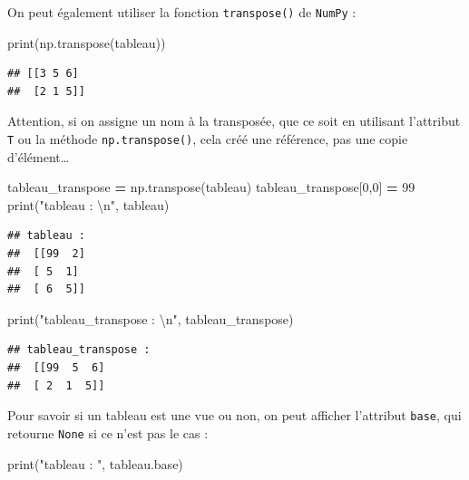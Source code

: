 \documentclass[12pt,]{book}
\newenvironment{Shaded}{\begin{snugshade}}{\end{snugshade}}
\newcommand{\DecValTok}[1]{\textcolor[rgb]{0.00,0.00,0.81}{#1}}
\newcommand{\CharTok}[1]{\textcolor[rgb]{0.31,0.60,0.02}{#1}}
\newcommand{\StringTok}[1]{\textcolor[rgb]{0.31,0.60,0.02}{#1}}
\newcommand{\OperatorTok}[1]{\textcolor[rgb]{0.81,0.36,0.00}{\textbf{#1}}}
\newcommand{\BuiltInTok}[1]{#1}
\newcommand{\NormalTok}[1]{#1}
\numberwithin{equation}{section}
\numberwithin{countremarque}{section}
\begin{document}
On peut également utiliser la fonction \texttt{transpose()} de
\texttt{NumPy} :

\begin{Shaded}
\begin{Highlighting}[]
\BuiltInTok{print}\NormalTok{(np.transpose(tableau))}
\end{Highlighting}
\end{Shaded}

\begin{lstlisting}
## [[3 5 6]
##  [2 1 5]]
\end{lstlisting}

Attention, si on assigne un nom à la transposée, que ce soit en
utilisant l'attribut \texttt{T} ou la méthode \texttt{np.transpose()},
cela créé une référence, pas une copie d'élément\ldots{}

\begin{Shaded}
\begin{Highlighting}[]
\NormalTok{tableau_transpose }\OperatorTok{=}\NormalTok{ np.transpose(tableau)}
\NormalTok{tableau_transpose[}\DecValTok{0}\NormalTok{,}\DecValTok{0}\NormalTok{] }\OperatorTok{=} \DecValTok{99}
\BuiltInTok{print}\NormalTok{(}\StringTok{"tableau : }\CharTok{\textbackslash{}n}\StringTok{"}\NormalTok{, tableau)}
\end{Highlighting}
\end{Shaded}

\begin{lstlisting}
## tableau : 
##  [[99  2]
##  [ 5  1]
##  [ 6  5]]
\end{lstlisting}

\begin{Shaded}
\begin{Highlighting}[]
\BuiltInTok{print}\NormalTok{(}\StringTok{"tableau_transpose : }\CharTok{\textbackslash{}n}\StringTok{"}\NormalTok{, tableau_transpose)}
\end{Highlighting}
\end{Shaded}

\begin{lstlisting}
## tableau_transpose : 
##  [[99  5  6]
##  [ 2  1  5]]
\end{lstlisting}

Pour savoir si un tableau est une vue ou non, on peut afficher
l'attribut \texttt{base}, qui retourne \texttt{None} si ce n'est pas le
cas :

\begin{Shaded}
\begin{Highlighting}[]
\BuiltInTok{print}\NormalTok{(}\StringTok{"tableau : "}\NormalTok{, tableau.base)}
\end{Highlighting}
\end{Shaded}
\end{document}
